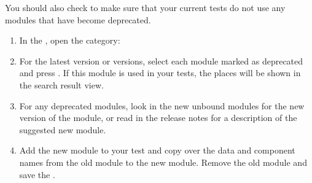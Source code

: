 You should also check to make sure that your current tests do not use any modules that have become deprecated.

\begin{enumerate}
\item In the \gdtestcasebrowser{}, open the category:\\
\item For the latest version or versions, select each module marked as deprecated and press . If this module is used in your tests, the places will be shown in the search result view. 
\item For any deprecated modules, look in the new unbound modules for the new version of the module, or read in the release notes for a description of the suggested new module.
\item Add the new module to your test and copy over the data and component names from the old module to the new module. Remove the old module and save the \gdcase{}.
\end{enumerate}





 



